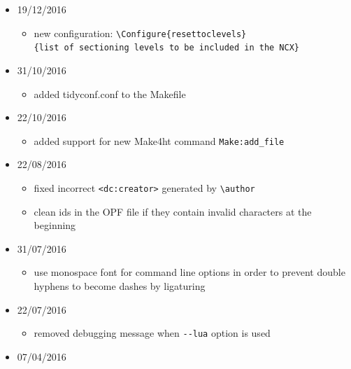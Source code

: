\begin{itemize}
  \begin{itemize}
  \tightlist
  \item
    pass \texttt{settings} table to the build file.
  \end{itemize}
\item
  19/12/2016

  \begin{itemize}
  \tightlist
  \item
    new configuration:
    \texttt{\textbackslash{}Configure\{resettoclevels\}\{list\ of\ sectioning\ levels\ to\ be\ included\ in\ the\ NCX\}}
  \end{itemize}
\item
  31/10/2016

  \begin{itemize}
  \tightlist
  \item
    added tidyconf.conf to the Makefile
  \end{itemize}
\item
  22/10/2016

  \begin{itemize}
  \tightlist
  \item
    added support for new Make4ht command \texttt{Make:add\_file}
  \end{itemize}
\item
  22/08/2016

  \begin{itemize}
  \tightlist
  \item
    fixed incorrect \texttt{\textless{}dc:creator\textgreater{}}
    generated by \texttt{\textbackslash{}author}
  \item
    clean ids in the OPF file if they contain invalid characters at the
    beginning
  \end{itemize}
\item
  31/07/2016

  \begin{itemize}
  \tightlist
  \item
    use monospace font for command line options in order to prevent
    double hyphens to become dashes by ligaturing
  \end{itemize}
\item
  22/07/2016

  \begin{itemize}
  \tightlist
  \item
    removed debugging message when \texttt{-\/-lua} option is used
  \end{itemize}
\item
  07/04/2016


\end{itemize}
